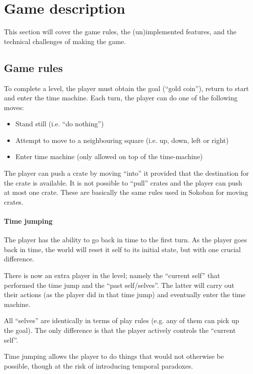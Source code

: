 \section{Game description}

This section will cover the game rules, the (un)implemented features,
and the technical challenges of making the game.

\subsection{Game rules}
To complete a level, the player must obtain the goal (``gold coin''),
return to start and enter the time machine.  Each turn, the player can
do one of the following moves:

\begin{itemize}
\item Stand still (i.e. ``do nothing'')
\item Attempt to move to a neighbouring square (i.e. up, down, left or right)
\item Enter time machine (only allowed on top of the time-machine)
\end{itemize}

The player can push a crate by moving ``into'' it provided that the
destination for the crate is available.  It is not possible to
``pull'' crates and the player can push at most one crate.  These
are basically the same rules used in Sokoban for moving crates.

\paragraph{Time jumping}
The player has the ability to go back in time to the first turn.  As
the player goes back in time, the world will reset it self to its
initial state, but with one crucial difference.

There is now an extra player in the level; namely the ``current self''
that performed the time jump and the ``past self/selves''.  The latter
will carry out their actions (as the player did in that time jump) and
eventually enter the time machine.

All ``selves'' are identically in terms of play rules (e.g. any of
them can pick up the goal).  The only difference is that the player
actively controls the ``current self''.

Time jumping allows the player to do things that would not otherwise
be possible, though at the risk of introducing temporal paradoxes.

